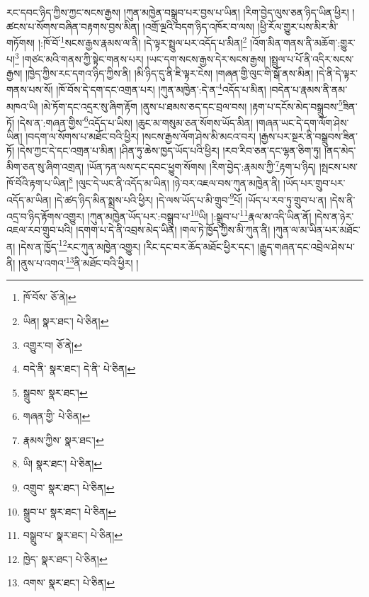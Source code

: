 རང་དབང་ཉིད་ཀྱིས་ཀྱང་སངས་རྒྱས། །ཀུན་མཁྱེན་བསྒྲུབ་པར་བྱས་པ་ཡིན། །རིག་བྱེད་ལུས་ཅན་ཉིད་ཡིན་ཕྱིར། །ཚངས་པ་སོགས་བཞིན་བརྟགས་བྱས་མིན། །འགྲོ་ལྔའི་བདག་ཉིད་འཁོར་བ་ལས། །ཕྱི་རོལ་གྱུར་པས་མིར་མི་གཏོགས། །:ཁོ་བོ་\footnote{ཁོ་བོས་  ཅོ་ནེ། }སངས་རྒྱས་རྣམས་ལ་ནི། །དེ་ལྟར་སྤྲུལ་པར་འདོད་པ་མིན།\footnote{ཡིན།  སྣར་ཐང་།  པེ་ཅིན། } །འོག་མིན་གནས་ནི་མཆོག་:གྱུར་པ།\footnote{འགྱུར་བ།  ཅོ་ནེ། } །གཙང་མའི་གནས་ཀྱི་སྟེང་གནས་པར། །ཡང་དག་སངས་རྒྱས་དེར་སངས་རྒྱས། །སྤྲུལ་པ་པོ་ནི་འདིར་སངས་རྒྱས། །ཁྱེད་ཀྱིས་རང་དགའ་ཉིད་ཀྱིས་ནི། །མི་ཉིད་དུ་ནི་ཇི་ལྟར་ངེས། །གཞན་གྱི་ལུང་གི་སྒོ་ནས་མིན། །དེ་ནི་དེ་ལྟར་གནས་པས་སོ། །ཁོ་བོས་དེ་དག་དང་འགྲན་པར། །ཀུན་མཁྱེན་:དེ་ན་\footnote{བདེ་ནི་  སྣར་ཐང་། དེ་ནི་  པེ་ཅིན། }འདོད་པ་མིན། །བདེན་པ་རྣམས་ནི་ནམ་མཁའ་ཡི། །མེ་ཏོག་དང་འདྲར་སུ་ཞིག་རྟོག །ནུས་པ་ཐམས་ཅད་དང་བྲལ་བས། །རྟག་པ་དངོས་མེད་བསྒྲུབས་\footnote{སྒྲུབས་  སྣར་ཐང་། }ཟིན་ཏོ། །དེས་ན་:གཞན་གྱིས་\footnote{གཞན་གྱི་  པེ་ཅིན། }འདོད་པ་ཡིས། །ཆུང་མ་གསུམ་ཅན་སོགས་ཡོད་མིན། །གཞན་ཡང་དེ་དག་ལོག་ཤེས་ཡིན། །བདག་ལ་སོགས་པ་མཐོང་བའི་ཕྱིར། །སངས་རྒྱས་ལོག་ཤེས་མི་མངའ་བར། །རྒྱས་པར་སྔར་ནི་བསྒྲུབས་ཟིན་ཏོ། །དེས་ཀྱང་དེ་དང་འགྲན་པ་མིན། །ཤིན་ཏུ་ཆེས་ཁྱད་ཡོད་པའི་ཕྱིར། །རབ་རིབ་ཅན་དང་ལྷན་ཅིག་ཏུ། །ནད་མེད་མིག་ཅན་སུ་ཞིག་འགྲན། །ཡོན་ཏན་ལས་དང་དབང་ཕྱུག་སོགས། །རིག་བྱེད་:རྣམས་ཀྱི་\footnote{རྣམས་ཀྱིས་  སྣར་ཐང་། }རྟག་པ་ཉིད། །སྤངས་པས་ཁོ་བོའི་རྟག་པ་ཡིན།\footnote{ཡི།  སྣར་ཐང་།  པེ་ཅིན། } །ལུང་དེ་ཡང་ནི་འདོད་མ་ཡིན། །ཉེ་བར་འཇལ་བས་ཀུན་མཁྱེན་ནི། །ཡོད་པར་གྲུབ་པར་འདོད་མ་ཡིན། །དེ་ཚད་ཉིད་མིན་སྨྲས་པའི་ཕྱིར། །དེ་ལས་ཡོད་པ་མི་གྲུབ་\footnote{འགྲུབ་  སྣར་ཐང་།  པེ་ཅིན། }པོ། །ཡོད་པ་རབ་ཏུ་གྲུབ་པ་ན། །དེས་ནི་འདྲ་བ་ཉིད་རྟོགས་འགྱུར། །ཀུན་མཁྱེན་ཡོད་པར་:བསྒྲུབ་པ་\footnote{སྒྲུབ་པ་  སྣར་ཐང་།  པེ་ཅིན། }ཡི། །:སྒྲུབ་པ་\footnote{བསྒྲུབ་པ་  སྣར་ཐང་།  པེ་ཅིན། }རྣལ་མ་འདི་ཡིན་ནོ། །དེས་ན་ཉེར་འཇལ་རབ་གྲུབ་པའི། །དགག་པ་དེ་ནི་འབྲས་མེད་ཡིན། །གལ་ཏེ་ཁྱོད་ཀྱིས་མི་ཀུན་ནི། །ཀུན་ལ་མ་ཡིན་པར་མཐོང་ན། །དེས་ན་ཁྱོད་\footnote{ཁྱེད་  སྣར་ཐང་།  པེ་ཅིན། }རང་ཀུན་མཁྱེན་འགྱུར། །རིང་དང་བར་ཆོད་མཐོང་ཕྱིར་དང་། །རྒྱུད་གཞན་དང་འབྲེལ་ཤེས་པ་ནི། །ནུས་པ་འགའ་\footnote{འགས་  སྣར་ཐང་།  པེ་ཅིན། }ནི་མཐོང་བའི་ཕྱིར། །

